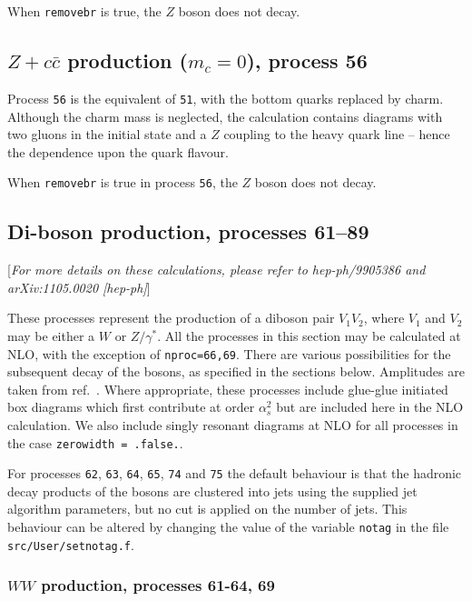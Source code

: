 \documentclass{article}
\begin{document}
When {\tt removebr} is true, the $Z$ boson does not decay.

\subsection{$Z+c{\bar c}$ production ($m_c=0$), process 56}
\label{subsec:zccmassless}

Process {\tt 56} is the equivalent of {\tt 51}, with the bottom quarks
replaced by charm. Although the charm mass is neglected, the calculation
contains diagrams with two gluons in the initial state and a
$Z$ coupling to the heavy quark line -- hence the dependence upon the quark
flavour.

When {\tt removebr} is true in process {\tt 56}, the $Z$ boson does not decay.

\subsection{Di-boson production, processes 61--89}
\label{subsec:diboson}

\begin{center}
[{\it For more details on these calculations, please refer to hep-ph/9905386
and arXiv:1105.0020 [hep-ph]}]
\end{center}

These processes represent the production of a diboson pair $V_1 V_2$,
where $V_1$ and $V_2$ may be either a $W$ or $Z/\gamma^*$. 
All the processes in this section may be calculated at NLO, with the exception
of {\tt nproc=66,69}. There are various
possibilities for the subsequent decay of the bosons, as specified in the
sections below. Amplitudes are taken from ref.~\cite{Dixon:1998py}.
Where appropriate, these processes include glue-glue initiated box diagrams
which first contribute at order $\alpha_s^2$ but are included here in the
NLO calculation. We also include singly resonant diagrams at NLO for all processes
in the case {\tt zerowidth = .false.}.

For processes {\tt 62}, {\tt 63}, {\tt 64}, {\tt 65}, {\tt 74}
and {\tt 75} the default behaviour is that the hadronic decay products
of the bosons are clustered into jets using the supplied jet
algorithm parameters, but no cut is applied on the number of jets.
This behaviour can be altered by changing the value of the
variable {\tt notag} in the file {\tt src/User/setnotag.f}.
 
\subsubsection{$WW$ production, processes 61-64, 69}
\end{document}

